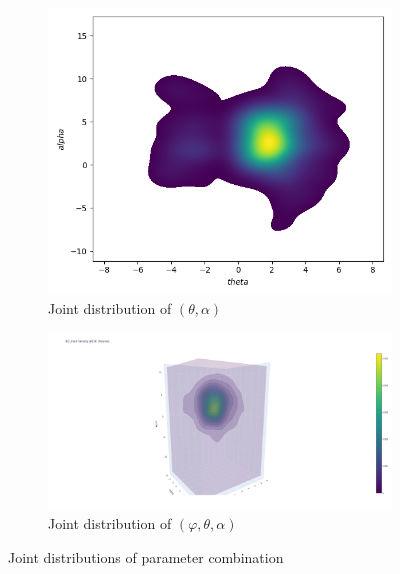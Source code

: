 \documentclass[a4paper,12pt]{article}
\theoremstyle{definition}
\begin{document}
\begin{figure}[H]
    \vspace{0.5em}

    \begin{subfigure}[b]{0.45\textwidth}
        \centering
        \includegraphics[width=\textwidth]{VariableSelection/joint_theta_alpha.png}
        \caption{Joint distribution of \((\theta, \alpha)\)}
        \label{fig:joint_theta_alpha}
    \end{subfigure}
    \hfill
    \begin{subfigure}[b]{0.45\textwidth}
        \centering
        \includegraphics[width=\textwidth]{VariableSelection/joint3D.png}
        \caption{Joint distribution of \((\varphi, \theta, \alpha)\)}
        \label{fig:joint3D}
    \end{subfigure}

    \caption{Joint distributions of parameter combination}
    \label{fig:joint_distributions}
\end{figure}
\end{document}
